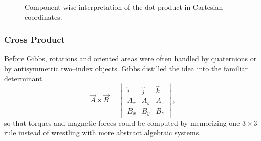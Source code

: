 \begin{figure}[H]
    \centering
    \caption{Component‐wise interpretation of the dot product in Cartesian coordinates.}
\end{figure}





\subsubsection{Cross Product}
Before Gibbs, rotations and oriented areas were often handled by quaternions or by antisymmetric two–index objects.  Gibbs distilled the idea into the familiar determinant
\[
\vec A\times\vec B
=\begin{vmatrix}
\hat i & \hat j & \hat k\\
A_x    & A_y    & A_z\\
B_x    & B_y    & B_z
\end{vmatrix},
\]
so that torques and magnetic forces could be computed by memorizing one \(3\times3\) rule instead of wrestling with more abstract algebraic systems.


